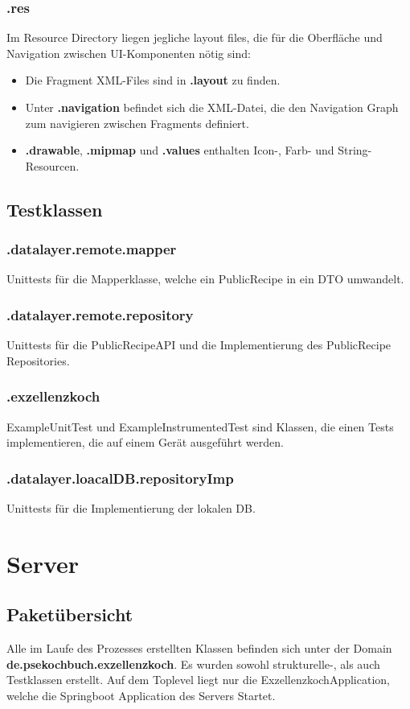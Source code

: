 \subsubsection{.res}
Im Resource Directory liegen jegliche layout files, die für die Oberfläche und Navigation zwischen UI-Komponenten nötig sind:
\begin{itemize}
	\item Die Fragment XML-Files sind in \textbf{.layout} zu finden.
	\item Unter \textbf{.navigation} befindet sich die XML-Datei, die den Navigation Graph zum navigieren zwischen Fragments definiert.
	\item \textbf{.drawable}, \textbf{.mipmap} und \textbf{.values} enthalten Icon-, Farb- und String-Resourcen.
\end{itemize}

\subsection{Testklassen}
\subsubsection{.datalayer.remote.mapper}
Unittests für die Mapperklasse, welche ein PublicRecipe in ein DTO umwandelt.

\subsubsection{.datalayer.remote.repository}
Unittests für die PublicRecipeAPI und die Implementierung des PublicRecipe Repositories.

\subsubsection{.exzellenzkoch}
ExampleUnitTest und ExampleInstrumentedTest sind Klassen, die einen Tests implementieren, die auf einem Gerät ausgeführt werden.

\subsubsection{.datalayer.loacalDB.repositoryImp}
Unittests für die Implementierung der lokalen DB.


\section{Server}
\subsection{Paketübersicht}
Alle im Laufe des Prozesses erstellten Klassen befinden sich unter der Domain \\
\textbf{de.psekochbuch.exzellenzkoch}. Es wurden sowohl strukturelle-, als auch Testklassen erstellt. 
Auf dem Toplevel liegt nur die ExzellenzkochApplication, welche die Springboot Application des Servers Startet.

